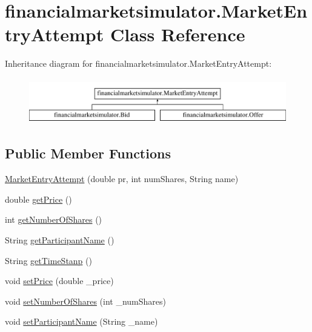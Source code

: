 \hypertarget{classfinancialmarketsimulator_1_1_market_entry_attempt}{\section{financialmarketsimulator.\+Market\+Entry\+Attempt Class Reference}
\label{classfinancialmarketsimulator_1_1_market_entry_attempt}
}
Inheritance diagram for financialmarketsimulator.\+Market\+Entry\+Attempt\+:\begin{figure}[H]
\begin{center}
\leavevmode
\includegraphics[height=2.000000cm]{classfinancialmarketsimulator_1_1_market_entry_attempt}
\end{center}
\end{figure}
\subsection*{Public Member Functions}
\begin{DoxyCompactItemize}
\item 
\hyperlink{classfinancialmarketsimulator_1_1_market_entry_attempt_a9b2f8a9eef7975bc053907e2ea05c779}{Market\+Entry\+Attempt} (double pr, int num\+Shares, String name)
\item 
double \hyperlink{classfinancialmarketsimulator_1_1_market_entry_attempt_a465bd475d2cf836c09e51e26ae937e66}{get\+Price} ()
\item 
int \hyperlink{classfinancialmarketsimulator_1_1_market_entry_attempt_ae48c6d1bc9ef23b88d077ee194686946}{get\+Number\+Of\+Shares} ()
\item 
String \hyperlink{classfinancialmarketsimulator_1_1_market_entry_attempt_a7c461ce88325da7ce771ef3e8284616c}{get\+Participant\+Name} ()
\item 
String \hyperlink{classfinancialmarketsimulator_1_1_market_entry_attempt_a48ec5ce3d7d0451da742f3290f0e3b52}{get\+Time\+Stanp} ()
\item 
void \hyperlink{classfinancialmarketsimulator_1_1_market_entry_attempt_ac350f88eed14da376cb58aa920df2f38}{set\+Price} (double \+\_\+price)
\item 
void \hyperlink{classfinancialmarketsimulator_1_1_market_entry_attempt_a27476573fd4a0aa03270c648500a3c98}{set\+Number\+Of\+Shares} (int \+\_\+num\+Shares)
\item 
void \hyperlink{classfinancialmarketsimulator_1_1_market_entry_attempt_af2b5d63e0ac8d2e39cf474e128739c8a}{set\+Participant\+Name} (String \+\_\+name)
\end{DoxyCompactItemize}
